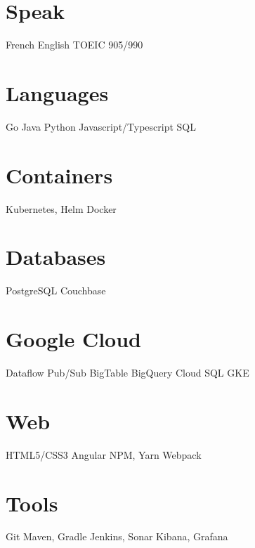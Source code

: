 \documentclass[hidelinks]{cv-style}          %
\begin{document}
\poste{}

\begin{aside}
\section{Speak}
French
English
TOEIC 905/990
%
\section{Languages}
Go
Java
Python
Javascript/Typescript
SQL
\section{Containers}
Kubernetes, Helm
Docker
\section{Databases}
PostgreSQL
Couchbase
\section{Google Cloud}
Dataflow
Pub/Sub
BigTable
BigQuery
Cloud SQL
GKE
\section{Web}
HTML5/CSS3
Angular
NPM, Yarn
Webpack
\section{Tools}
Git
Maven, Gradle
Jenkins, Sonar
Kibana, Grafana
%
\end{aside}






\end{document}
